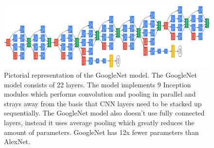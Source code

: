 \begin{figure}[htp!]
\centering
\includegraphics[width=\linewidth]{figs/googlenet.png}
\caption{Pictorial representation of the GoogleNet model. The GoogleNet model consists of 22 layers. The model implements 9 Inception modules which performs convolution and pooling in parallel and strays away from the basis that CNN layers need to be stacked up sequentially. The GoogleNet model also doesn't use fully connected layers, instead it uses average pooling which greatly reduces the amount of parameters. GoogleNet has 12x fewer parameters than AlexNet. }
\label{fig:googlenet}
\end{figure}

